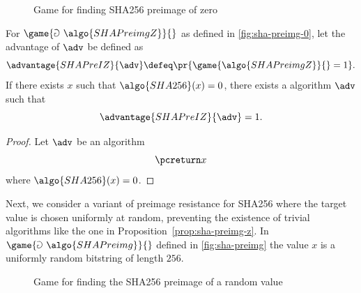 \begin{figure}[tbhp]
  \begin{center}
    \begin{tcolorbox}[width=5cm]
      \begin{pchstack}[center]
      \end{pchstack}
    \end{tcolorbox}
  \end{center}
  \caption{Game for finding SHA256 preimage of zero \label{fig:sha-preimg-0}}
\end{figure}

\begin{proposition}\label{prop:sha-preimg-z}
 For $\game{\Game~\algo{SHAPreimgZ}}{}$ as defined in \autoref{fig:sha-preimg-0}, let the advantage of $\adv$ be defined as
 \[
  \advantage{SHAPreIZ}{\adv} \defeq \pr{\game{\algo{SHAPreimgZ}}{} = 1}.
 \]
 If there exists $x$ such that $\algo{SHA256}(x) = 0$, there exists a \ppt algorithm $\adv$ such that
  \[
  \advantage{SHAPreIZ}{\adv} = 1.
  \]
\end{proposition}

\begin{proof}
  Let $\adv$ be an algorithm
  \[
   \pcreturn x
  \]
  where $\algo{SHA256}(x) = 0$.
\end{proof}

Next, we consider a variant of preimage resistance for SHA256 where the target value is chosen uniformly at random, preventing the existence of trivial algorithms like the one in Proposition~\ref{prop:sha-preimg-z}.
In $\game{\Game~\algo{SHAPreimg}}{}$ defined in \autoref{fig:sha-preimg} the value $x$ is a uniformly random bitstring of length $256$.

\begin{figure}[tbhp]
  \begin{center}
    \begin{tcolorbox}[width=5cm]
      \begin{pchstack}[center]
      \end{pchstack}
    \end{tcolorbox}
  \end{center}
  \caption{Game for finding the SHA256 preimage of a random value \label{fig:sha-preimg}}
\end{figure}


